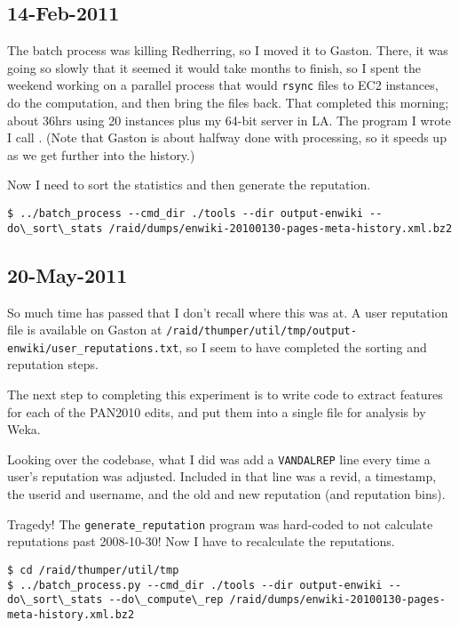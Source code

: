 \subsection{14-Feb-2011}

The batch process was killing Redherring, so I moved it to Gaston.
There, it was going so slowly that it seemed it would take months
to finish, so I spent the weekend working on a parallel process that
would \texttt{rsync} files to EC2 instances, do the computation,
and then bring the files back.
That completed this morning; about 36hrs using 20 instances plus
my 64-bit server in LA.
The program I wrote I call .
(Note that Gaston is about halfway done with processing, so
it speeds up as we get further into the history.)

Now I need to sort the statistics and then generate the reputation.
\begin{verbatim}
$ ../batch_process --cmd_dir ./tools --dir output-enwiki --do\_sort\_stats /raid/dumps/enwiki-20100130-pages-meta-history.xml.bz2
\end{verbatim}

\subsection{20-May-2011}

So much time has passed that I don't recall where this was at.
A user reputation file is available on Gaston at
\texttt{/raid/thumper/util/tmp/output-enwiki/user\_reputations.txt},
so I seem to have completed the sorting and reputation steps.

The next step to completing this experiment is to write code to
extract features for each of the PAN2010 edits, and put them into
a single file for analysis by Weka.

Looking over the codebase, what I did was add a \texttt{VANDALREP}
line every time a user's reputation was adjusted.
Included in that line was a revid, a timestamp, the userid and username,
and the old and new reputation (and reputation bins).

Tragedy!  The \texttt{generate\_reputation} program was hard-coded
to not calculate reputations past 2008-10-30!
Now I have to recalculate the reputations.

\begin{verbatim}
$ cd /raid/thumper/util/tmp
$ ../batch_process.py --cmd_dir ./tools --dir output-enwiki --do\_sort\_stats --do\_compute\_rep /raid/dumps/enwiki-20100130-pages-meta-history.xml.bz2
\end{verbatim}

